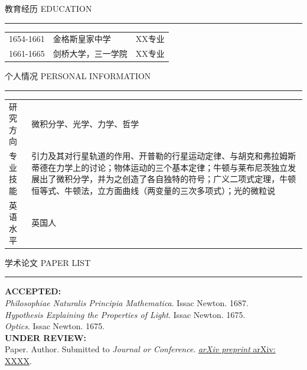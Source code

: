 \documentclass{resume}
\begin{document}
\vfill



\begin{minipage}{\textwidth}
\large \faUniversity \quad {} 教育经历 \hfill EDUCATION\\
\rule[8pt]{\textwidth}{1pt}
\small
\normalfont
\begin{tabular}{m{}<{\raggedright}m{}<{\centering}m{}<{\centering}}
	1654-1661&金格斯皇家中学&XX专业\\
	1661-1665&剑桥大学，三一学院&XX专业\\
\end{tabular}

\vspace{1em}
\large \faUserGraduate \quad {} 个人情况 \hfill PERSONAL INFORMATION\\
\rule[8pt]{\textwidth}{1pt}
\small
\begin{tabular}{p{4em}<{\raggedright}p{}<{\raggedright}}
	研究方向&\normalfont 微积分学、光学、力学、哲学\\
	专业技能&\normalfont 引力及其对行星轨道的作用、开普勒的行星运动定律、与胡克和弗拉姆斯蒂德在力学上的讨论；物体运动的三个基本定律；牛顿与莱布尼茨独立发展出了微积分学，并为之创造了各自独特的符号；广义二项式定理，牛顿恒等式、牛顿法，立方面曲线（两变量的三次多项式）；光的微粒说\\
	英语水平&\normalfont 英国人\\
\end{tabular}
\end{minipage}


\vfill


\begin{minipage}{\textwidth}
\large \faFile \quad {} 学术论文 \hfill PAPER LIST\\
\rule[8pt]{\textwidth}{1pt}
\small
\textbf{ACCEPTED:}\\
\textit{Philosophiae Naturalis Principia Mathematica}. Issac Newton. 1687.\\
\textit{Hypothesis Explaining the Properties of Light}. Issac Newton. 1675.\\
\textit{Optics}. Issac Newton. 1675.\\
\textbf{UNDER REVIEW:}\\
Paper. Author. Submitted to \emph{Journal or Conference}. \href{https://arxiv.org/abs/XXXX}{\textit{arXiv preprint} arXiv: XXXX}.\\
\end{minipage}
\end{document}
